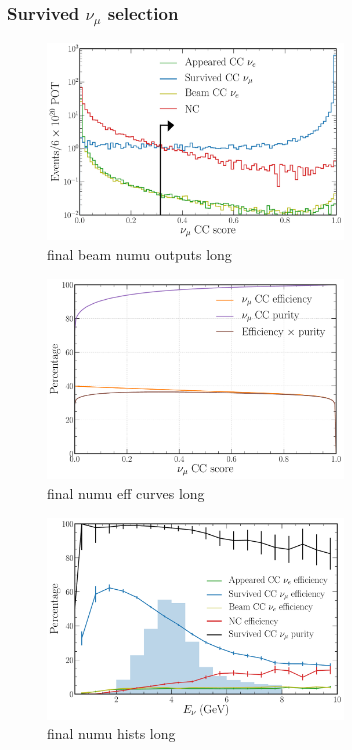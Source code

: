 \subsubsection*{Survived $\nu_{\mu}$ selection} %

\begin{figure} %
    \includegraphics[width=0.7\textwidth]{diagrams/6-cvn/chipsnet/final_beam_numu_outputs.pdf}
    \caption[final beam numu outputs short]
    {final beam numu outputs long}
    \label{fig:final_beam_numu_outputs}
\end{figure}

\begin{figure} %
    \includegraphics[width=0.7\textwidth]{diagrams/6-cvn/chipsnet/final_numu_eff_curves.pdf}
    \caption[final numu eff curves short]
    {final numu eff curves long}
    \label{fig:final_numu_eff_curves}
\end{figure}

\begin{figure} %
    \includegraphics[width=0.7\textwidth]{diagrams/6-cvn/chipsnet/final_numu_hists.pdf}
    \caption[final numu hists short]
    {final numu hists long}
    \label{fig:final_numu_hists}
\end{figure}

